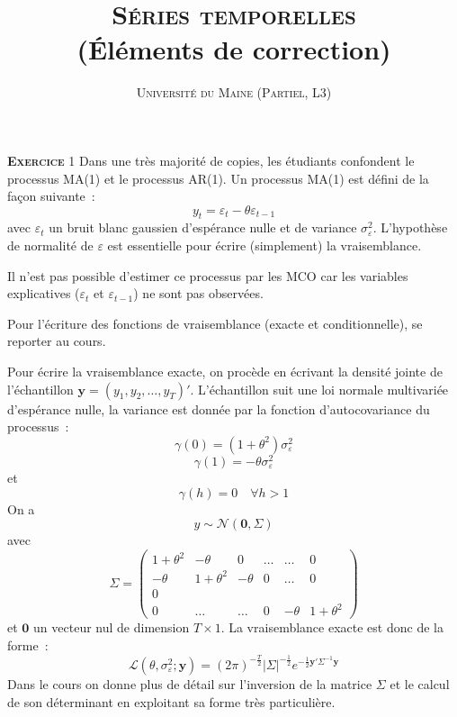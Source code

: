 \documentclass[10pt,a4paper,notitlepage,twocolumn]{article}
\newcommand{\exercice}[1]{\textsc{\textbf{Exercice}} #1}
\begin{document}
\title{\textsc{Séries temporelles}\\(Éléments de correction)}
\author{\textsc{Université du Maine (Partiel, L3)}}
\date{}


\maketitle

\exercice{1} Dans une très majorité de copies, les étudiants
confondent le processus MA(1) et le processus AR(1). Un processus
MA(1) est défini de la façon suivante :
\[
y_t = \varepsilon_t - \theta \varepsilon_{t-1}
\]
avec $\varepsilon_t$ un bruit blanc gaussien d'espérance nulle et de
variance $\sigma_{\varepsilon}^2$. L'hypothèse de normalité de
$\varepsilon$ est essentielle pour écrire (simplement) la
vraisemblance.\newline

Il n'est pas possible d'estimer ce processus par les MCO car les
variables explicatives ($\varepsilon_t$ et $\varepsilon_{t-1}$) ne sont
pas observées.\newline

Pour l'écriture des fonctions de vraisemblance (exacte et
conditionnelle), se reporter au cours.\newline

Pour écrire la vraisemblance exacte, on procède en écrivant la densité
jointe de l'échantillon $ \mathbf y =
(y_1,y_2,\dots,y_T)'$. L'échantillon suit une loi normale multivariée
d'espérance nulle, la variance est donnée par la fonction
d'autocovariance du processus :
\[
\gamma(0) = (1+\theta^2)\sigma_{\varepsilon}^2
\]
\[
\gamma(1) = -\theta\sigma_{\varepsilon}^2
\]
et
\[
\gamma(h) = 0 \quad \forall h>1
\]
On a
\[
y \sim \mathcal N (\mathbf 0, \Sigma)
\]
avec
\[
  \Sigma =
  \begin{pmatrix}
    1+\theta^2 & -\theta & 0 & \dots & \dots & 0 \\
    -\theta & 1+\theta^2 & -\theta & 0 & \dots & 0\\
    0& & & & & \\
    0& \dots& \dots & 0& -\theta & 1+\theta^2 
  \end{pmatrix}
\]
et $\mathbf 0$ un vecteur nul de dimension $T\times 1$. La
vraisemblance exacte est donc de la forme :
\[
\mathcal L(\theta, \sigma_{\varepsilon}^2; \mathbf y) = (2\pi)^{-\frac{T}{2}}|\Sigma|^{-\frac{1}{2}}e^{-\frac{1}{2}\mathbf y' \Sigma^{-1} \mathbf y}
\]
Dans le cours on donne plus de détail sur l'inversion de la matrice
$\Sigma$ et le calcul de son déterminant en exploitant sa forme très
particulière.\newline
\end{document}
